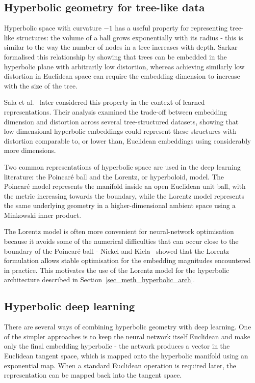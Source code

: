 \subsection{Hyperbolic geometry for tree-like data}
\label{sec_lit_geometry_hyperbolic}

Hyperbolic space with curvature $-1$ has a useful property for representing tree-like structures:
the volume of a ball grows exponentially with its radius -
this is similar to the way the number of nodes in a tree increases with depth.
Sarkar~\cite{sarkar2011treeembed} formalised this relationship
by showing that trees can be embedded in the hyperbolic plane with arbitrarily low distortion,
whereas achieving similarly low distortion in Euclidean space
can require the embedding dimension to increase with the size of the tree.

Sala et al.~\cite{sala2018learningmrep} later considered this property in the context of learned representations.
Their analysis examined the trade-off between embedding dimension and distortion
across several tree-structured datasets,
showing that low-dimensional hyperbolic embeddings could represent these structures
with distortion comparable to, or lower than, Euclidean embeddings using considerably more dimensions.

Two common representations of hyperbolic space are used in the deep learning literature:
the Poincar\'e ball and the Lorentz, or hyperboloid, model.
The Poincar\'e model represents the manifold inside an open Euclidean unit ball,
with the metric increasing towards the boundary,
while the Lorentz model represents the same underlying geometry
in a higher-dimensional ambient space using a Minkowski inner product.

The Lorentz model is often more convenient for neural-network optimisation
because it avoids some of the numerical difficulties
that can occur close to the boundary of the Poincar\'e ball -
Nickel and Kiela~\cite{nickel2018lorentz} showed that the Lorentz formulation
allows stable optimisation for the embedding magnitudes encountered in practice.
This motivates the use of the Lorentz model
for the hyperbolic architecture described in Section~\ref{sec_meth_hyperbolic_arch}.

\subsection{Hyperbolic deep learning}
\label{sec_lit_geometry_hyperbolic_dl}

There are several ways of combining hyperbolic geometry with deep learning.
One of the simpler approaches is to keep the neural network itself Euclidean
and make only the final embedding hyperbolic -
the network produces a vector in the Euclidean tangent space,
which is mapped onto the hyperbolic manifold using an exponential map.
When a standard Euclidean operation is required later,
the representation can be mapped back into the tangent space.

